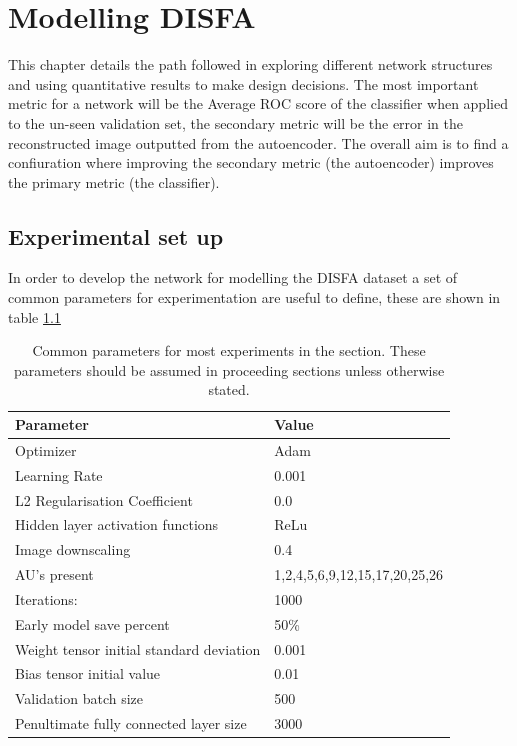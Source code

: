 \chapter{Modelling DISFA}
This chapter details the path followed in exploring different network structures
and using quantitative results to make design decisions.
The most important metric for a network will be the Average ROC score of the classifier
when applied to the un-seen validation set, the secondary metric will be the error
in the reconstructed image outputted from the autoencoder. The overall aim is to
find a confiuration where improving the secondary metric (the autoencoder) improves
the primary metric (the classifier).

\section{Experimental set up}
In order to develop the network for modelling the DISFA dataset a set of common
parameters for experimentation are useful to define, these are shown in table \ref{tab:common}

\begin{table}[!h]
\centering
{ \footnotesize
\label{my-label}
\begin{tabular}{ll}
\hline
\textbf{Parameter}                       & \textbf{Value}                \\ \hline
Optimizer                                & Adam                          \\
Learning Rate                            & 0.001                         \\
L2 Regularisation Coefficient            & 0.0                           \\
Hidden layer activation functions         & ReLu                          \\
Image downscaling                        & 0.4                           \\
AU's present                             & 1,2,4,5,6,9,12,15,17,20,25,26 \\
Iterations:                              & 1000                          \\
Early model save percent                 & 50\%                          \\
Weight tensor initial standard deviation & 0.001                         \\
Bias tensor initial value                & 0.01                          \\
Validation batch size                    & 500                           \\
Penultimate fully connected layer size   & 3000                          \\
\hline
\end{tabular}
\caption{Common parameters for most experiments in the section. These parameters should be
assumed in proceeding sections unless otherwise stated.} \label{tab:common} }
\end{table}


